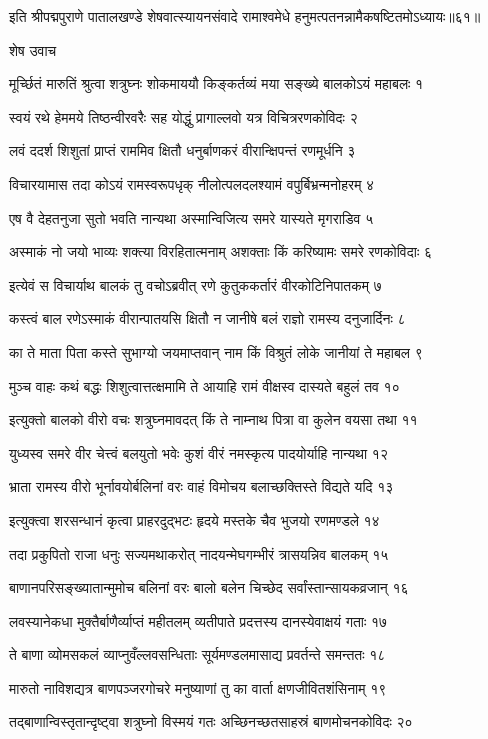 इति श्रीपद्मपुराणे पातालखण्डे शेषवात्स्यायनसंवादे रामाश्वमेधे हनुमत्पतनन्नामैकषष्टितमोऽध्यायः॥६१॥


शेष उवाच

मूर्च्छितं मारुतिं श्रुत्वा शत्रुघ्नः शोकमाययौ
किङ्कर्तव्यं मया सङ्ख्ये बालकोऽयं महाबलः १

स्वयं रथे हेममये तिष्ठन्वीरवरैः सह
योद्धुं प्रागाल्लवो यत्र विचित्ररणकोविदः २

लवं ददर्श शिशुतां प्राप्तं राममिव क्षितौ
धनुर्बाणकरं वीरान्क्षिपन्तं रणमूर्धनि ३

विचारयामास तदा कोऽयं रामस्वरूपधृक्
नीलोत्पलदलश्यामं वपुर्बिभ्रन्मनोहरम् ४

एष वै देहतनुजा सुतो भवति नान्यथा
अस्मान्विजित्य समरे यास्यते मृगराडिव ५

अस्माकं नो जयो भाव्यः शक्त्या विरहितात्मनाम्
अशक्ताः किं करिष्यामः समरे रणकोविदाः ६

इत्येवं स विचार्याथ बालकं तु वचोऽब्रवीत्
रणे कुतुककर्तारं वीरकोटिनिपातकम् ७

कस्त्वं बाल रणेऽस्माकं वीरान्पातयसि क्षितौ
न जानीषे बलं राज्ञो रामस्य दनुजार्दिनः ८

का ते माता पिता कस्ते सुभाग्यो जयमाप्तवान्
नाम किं विश्रुतं लोके जानीयां ते महाबल ९

मुञ्च वाहः कथं बद्धः शिशुत्वात्तत्क्षमामि ते
आयाहि रामं वीक्षस्व दास्यते बहुलं तव १०

इत्युक्तो बालको वीरो वचः शत्रुघ्नमावदत्
किं ते नाम्नाथ पित्रा वा कुलेन वयसा तथा ११

युध्यस्व समरे वीर चेत्त्वं बलयुतो भवेः
कुशं वीरं नमस्कृत्य पादयोर्याहि नान्यथा १२

भ्राता रामस्य वीरो भूर्नावयोर्बलिनां वरः
वाहं विमोचय बलाच्छक्तिस्ते विद्यते यदि १३

इत्युक्त्वा शरसन्धानं कृत्वा प्राहरदुद्भटः
हृदये मस्तके चैव भुजयो रणमण्डले १४

तदा प्रकुपितो राजा धनुः सज्यमथाकरोत्
नादयन्मेघगम्भीरं त्रासयन्निव बालकम् १५

बाणानपरिसङ्ख्यातान्मुमोच बलिनां वरः
बालो बलेन चिच्छेद सर्वांस्तान्सायकव्रजान् १६

लवस्यानेकधा मुक्तैर्बाणैर्व्याप्तं महीतलम्
व्यतीपाते प्रदत्तस्य दानस्येवाक्षयं गताः १७

ते बाणा व्योमसकलं व्याप्नुवँल्लवसन्धिताः
सूर्यमण्डलमासाद्य प्रवर्तन्ते समन्ततः १८

मारुतो नाविशद्यत्र बाणपञ्जरगोचरे
मनुष्याणां तु का वार्ता क्षणजीवितशंसिनाम् १९

तद्बाणान्विस्तृतान्दृष्ट्वा शत्रुघ्नो विस्मयं गतः
अच्छिनच्छतसाहस्रं बाणमोचनकोविदः २०

